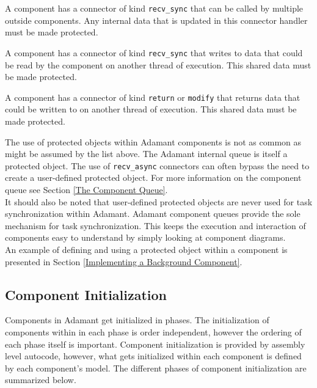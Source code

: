 \vspace{5mm} %
\begin{spaceditemize}
  \item A component has a connector of kind \texttt{recv\_sync} that can be called by multiple outside components. Any internal data that is updated in this connector handler must be made protected.
  \item A component has a connector of kind \texttt{recv\_sync} that writes to data that could be read by the component on another thread of execution. This shared data must be made protected.
  \item A component has a connector of kind \texttt{return} or \texttt{modify} that returns data that could be written to on another thread of execution. This shared data must be made protected.
\end{spaceditemize}
\vspace{5mm} %

The use of protected objects within Adamant components is not as common as might be assumed by the list above. The Adamant internal queue is itself a protected object. The use of \texttt{recv\_async} connectors can often bypass the need to create a user-defined protected object. For more information on the component queue see Section \ref{The Component Queue}. \\

It should also be noted that user-defined protected objects are never used for task synchronization within Adamant. Adamant component queues provide the sole mechanism for task synchronization. This keeps the execution and interaction of components easy to understand by simply looking at component diagrams. \\

An example of defining and using a protected object within a component is presented in Section \ref{Implementing a Background Component}.

\subsection{Component Initialization} \label{Component Initialization}

Components in Adamant get initialized in phases. The initialization of components within in each phase is order independent, however the ordering of each phase itself is important. Component initialization is provided by assembly level autocode, however, what gets initialized within each component is defined by each component's model. The different phases of component initialization are summarized below.


